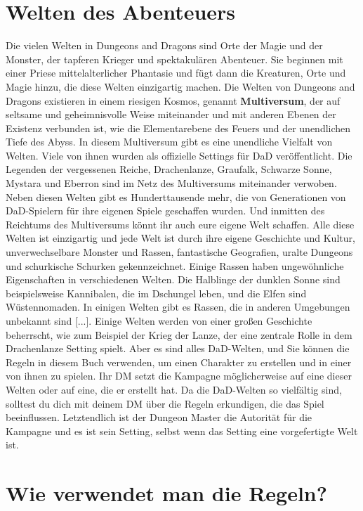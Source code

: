 \section{Welten des Abenteuers}
Die vielen Welten in Dungeons and Dragons sind Orte der Magie und der Monster, der tapferen Krieger und spektakulären Abenteuer. Sie beginnen mit einer Priese mittelalterlicher Phantasie und fügt dann die Kreaturen, Orte und Magie hinzu, die diese Welten einzigartig machen.
Die Welten von Dungeons and Dragons existieren in einem riesigen Kosmos, genannt \textbf{Multiversum}, der auf seltsame und geheimnisvolle Weise miteinander und mit anderen Ebenen der Existenz verbunden ist, wie die Elementarebene des Feuers und der unendlichen Tiefe des Abyss. In diesem Multiversum gibt es eine unendliche Vielfalt von Welten.
Viele von ihnen wurden als offizielle Settings für DaD veröffentlicht. Die Legenden der vergessenen Reiche, Drachenlanze, Graufalk, Schwarze Sonne, Mystara und Eberron sind im Netz des Multiversums miteinander verwoben. Neben diesen Welten gibt es Hunderttausende mehr, die von Generationen von DaD-Spielern für ihre eigenen Spiele geschaffen wurden. Und inmitten des Reichtums des Multiversums könnt ihr auch eure eigene Welt schaffen.
Alle diese Welten ist einzigartig und jede Welt ist durch ihre eigene Geschichte und Kultur, unverwechselbare Monster und Rassen, fantastische Geografien, uralte Dungeons und schurkische Schurken gekennzeichnet. Einige Rassen haben ungewöhnliche Eigenschaften in verschiedenen Welten. Die Halblinge der dunklen Sonne sind beispielsweise Kannibalen, die im Dschungel leben, und die Elfen sind Wüstennomaden. In einigen Welten gibt es Rassen, die in anderen Umgebungen unbekannt sind [...]. Einige Welten werden von einer großen Geschichte beherrscht, wie zum Beispiel der Krieg der Lanze, der eine zentrale Rolle in dem Drachenlanze Setting spielt. Aber es sind alles DaD-Welten, und Sie können die Regeln in diesem Buch verwenden, um einen Charakter zu erstellen und in einer von ihnen zu spielen. Ihr DM setzt die Kampagne möglicherweise auf eine dieser Welten oder auf eine, die er erstellt hat. Da die DaD-Welten so vielfältig sind, solltest du dich mit deinem DM über die Regeln erkundigen, die das Spiel beeinflussen. Letztendlich ist der Dungeon Master die Autorität für die Kampagne und es ist sein Setting, selbst wenn das Setting eine vorgefertigte Welt ist.
\newpage
\section{Wie verwendet man die Regeln?}

